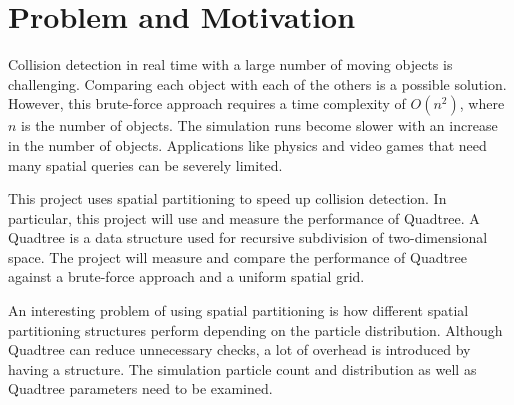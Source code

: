 \section*{Problem and Motivation}

Collision detection in real time with a large number of moving objects is challenging. Comparing
each object with each of the others is a possible solution. However, this brute-force approach requires a
time complexity of $O({n}^{2})$, where $n$ is the number of objects. The simulation runs become slower with an
increase in the number of objects. Applications like physics and video games that need many spatial
queries can be severely limited.

This project uses spatial partitioning to speed up collision detection. In particular, this project
will use and measure the performance of Quadtree. A Quadtree is a data structure used for recursive
subdivision of two-dimensional space. The project will measure and compare the performance of
Quadtree against a brute-force approach and a uniform spatial grid.

An interesting problem of using spatial partitioning is how different spatial partitioning
structures perform depending on the particle distribution. Although Quadtree can reduce unnecessary
checks, a lot of overhead is introduced by having a structure. The simulation particle count and
distribution as well as Quadtree parameters need to be examined.
